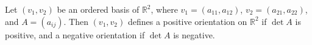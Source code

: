 Let $(v_1, v_2)$ be an ordered basis of $\mathbb{R}^2$, where $v_1 = (a_{11}, a_{12})$, $v_2 = (a_{21}, a_{22})$, and $A = (a_{ij})$. Then $(v_1, v_2)$ defines a positive orientation on $\mathbb{R}^2$ if $\det A$ is positive, and a negative orientation if $\det A$ is negative.
